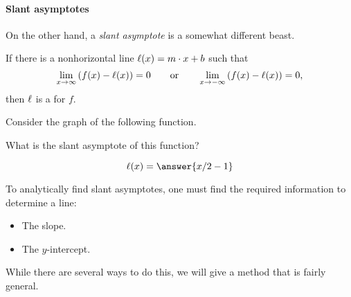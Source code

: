 \documentclass{ximera}
\begin{document}
\paragraph{Slant asymptotes}

On the other hand, a \textit{slant asymptote} is a somewhat different
beast.

\begin{definition}
  If there is a nonhorizontal line $\ell(x) = m\cdot x+b$ such that
  \[
  \lim_{x\to \infty}\left(f(x) - \ell(x)\right) = 0 \qquad\text{or}\qquad \lim_{x\to -\infty} \left( f(x) - \ell(x)\right) = 0,
  \]
  then $\ell$ is a  for $f$.
\end{definition}
\begin{question}
  Consider the graph of the following function. 
  \begin{image}
  \end{image}
  What is the slant asymptote of this function?
  \begin{prompt}
    \[
    \l(x) = \answer{x/2 -1}
    \]
  \end{prompt}
\end{question}

To analytically find slant asymptotes, one must find the required
information to determine a line:
\begin{itemize}
\item The slope.
\item The $y$-intercept.
\end{itemize}
While there are several ways to do this, we will give a method that is
fairly general.
\end{document}
